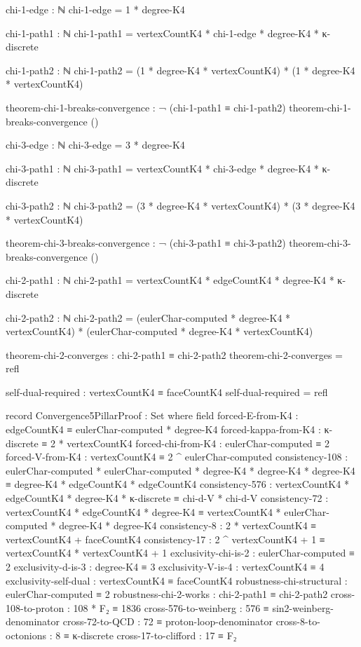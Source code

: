 \documentclass[11pt,a4paper]{book}
\begin{document}
\begin{code}
chi-1-edge : ℕ
chi-1-edge = 1 * degree-K4

chi-1-path1 : ℕ
chi-1-path1 = vertexCountK4 * chi-1-edge * degree-K4 * κ-discrete

chi-1-path2 : ℕ  
chi-1-path2 = (1 * degree-K4 * vertexCountK4) * (1 * degree-K4 * vertexCountK4)

theorem-chi-1-breaks-convergence : ¬ (chi-1-path1 ≡ chi-1-path2)
theorem-chi-1-breaks-convergence ()

chi-3-edge : ℕ
chi-3-edge = 3 * degree-K4

chi-3-path1 : ℕ
chi-3-path1 = vertexCountK4 * chi-3-edge * degree-K4 * κ-discrete

chi-3-path2 : ℕ
chi-3-path2 = (3 * degree-K4 * vertexCountK4) * (3 * degree-K4 * vertexCountK4)

theorem-chi-3-breaks-convergence : ¬ (chi-3-path1 ≡ chi-3-path2)
theorem-chi-3-breaks-convergence ()

chi-2-path1 : ℕ
chi-2-path1 = vertexCountK4 * edgeCountK4 * degree-K4 * κ-discrete

chi-2-path2 : ℕ
chi-2-path2 = (eulerChar-computed * degree-K4 * vertexCountK4) * (eulerChar-computed * degree-K4 * vertexCountK4)

theorem-chi-2-converges : chi-2-path1 ≡ chi-2-path2
theorem-chi-2-converges = refl

self-dual-required : vertexCountK4 ≡ faceCountK4
self-dual-required = refl

record Convergence5PillarProof : Set where
  field
    forced-E-from-K4      : edgeCountK4 ≡ eulerChar-computed * degree-K4
    forced-kappa-from-K4  : κ-discrete ≡ 2 * vertexCountK4
    forced-chi-from-K4    : eulerChar-computed ≡ 2
    forced-V-from-K4      : vertexCountK4 ≡ 2 ^ eulerChar-computed
    consistency-108 : eulerChar-computed * eulerChar-computed * degree-K4 * degree-K4 * degree-K4 
                    ≡ degree-K4 * edgeCountK4 * edgeCountK4
    consistency-576 : vertexCountK4 * edgeCountK4 * degree-K4 * κ-discrete 
                    ≡ chi-d-V * chi-d-V
    consistency-72  : vertexCountK4 * edgeCountK4 * degree-K4 
                    ≡ vertexCountK4 * eulerChar-computed * degree-K4 * degree-K4
    consistency-8   : 2 * vertexCountK4 ≡ vertexCountK4 + faceCountK4
    consistency-17  : 2 ^ vertexCountK4 + 1 ≡ vertexCountK4 * vertexCountK4 + 1
    exclusivity-chi-is-2      : eulerChar-computed ≡ 2
    exclusivity-d-is-3        : degree-K4 ≡ 3
    exclusivity-V-is-4        : vertexCountK4 ≡ 4
    exclusivity-self-dual     : vertexCountK4 ≡ faceCountK4
    robustness-chi-structural : eulerChar-computed ≡ 2
    robustness-chi-2-works    : chi-2-path1 ≡ chi-2-path2
    cross-108-to-proton : 108 * F₂ ≡ 1836
    cross-576-to-weinberg : 576 ≡ sin2-weinberg-denominator
    cross-72-to-QCD : 72 ≡ proton-loop-denominator
    cross-8-to-octonions : 8 ≡ κ-discrete
    cross-17-to-clifford : 17 ≡ F₂
\end{code}
\end{document}
